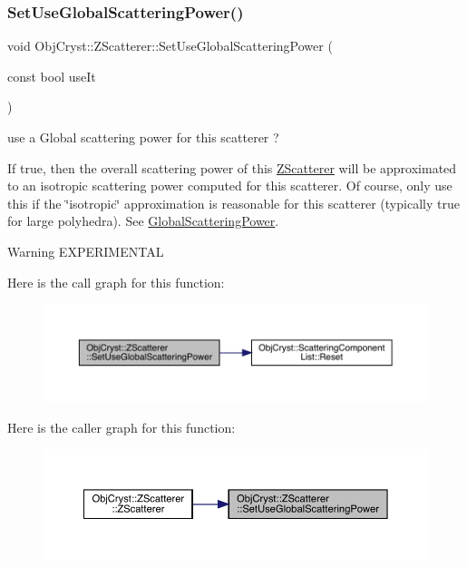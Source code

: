 \subsubsection{\texorpdfstring{SetUseGlobalScatteringPower()}{SetUseGlobalScatteringPower()}}
{\footnotesize\ttfamily void Obj\+Cryst\+::\+Z\+Scatterer\+::\+Set\+Use\+Global\+Scattering\+Power (\begin{DoxyParamCaption}\item[{const bool}]{use\+It }\end{DoxyParamCaption})\hspace{0.3cm}{\ttfamily [virtual]}}



use a Global scattering power for this scatterer ? 

If true, then the overall scattering power of this \mbox{\hyperlink{class_obj_cryst_1_1_z_scatterer}{Z\+Scatterer}} will be approximated to an isotropic scattering power computed for this scatterer. Of course, only use this if the \char`\"{}isotropic\char`\"{} approximation is reasonable for this scatterer (typically true for \textquotesingle{}large\textquotesingle{} polyhedra). See \mbox{\hyperlink{class_obj_cryst_1_1_global_scattering_power}{Global\+Scattering\+Power}}.

\begin{DoxyWarning}{Warning}
E\+X\+P\+E\+R\+I\+M\+E\+N\+T\+AL 
\end{DoxyWarning}
Here is the call graph for this function\+:
\nopagebreak
\begin{figure}[H]
\begin{center}
\leavevmode
\includegraphics[width=350pt]{class_obj_cryst_1_1_z_scatterer_afb19ed47922cd08146e1d4ce6a661dd3_cgraph}
\end{center}
\end{figure}
Here is the caller graph for this function\+:
\nopagebreak
\begin{figure}[H]
\begin{center}
\leavevmode
\includegraphics[width=350pt]{class_obj_cryst_1_1_z_scatterer_afb19ed47922cd08146e1d4ce6a661dd3_icgraph}
\end{center}
\end{figure}
\mbox{\label{class_obj_cryst_1_1_z_scatterer_ab6afaab6104211bbca7722033e17a128}} 
